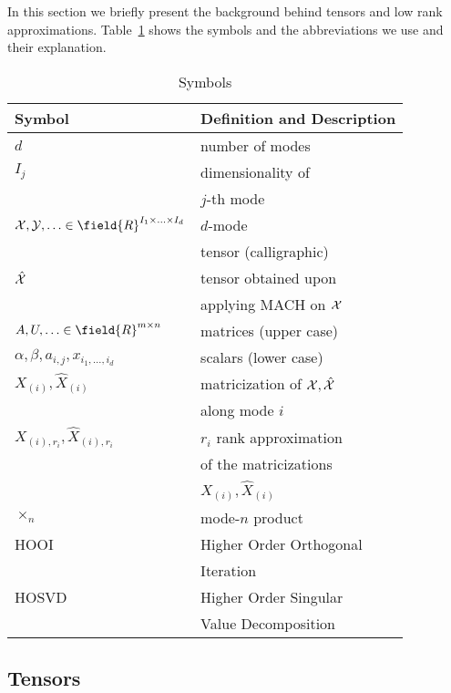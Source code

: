 In this section we briefly present the background behind tensors and low rank approximations. 
Table~\ref{tab:symbol} shows the symbols and the abbreviations we use and their explanation.

\begin{table}[htb]
\begin{center}
\begin{tabular}{|l|l|} \hline
Symbol & Definition and Description \\ \hline \hline
$d$ & number of modes \\ \hline
$I_j$ & dimensionality of \\ 
      &  $j$-th mode \\ \hline 
${\cal X,Y},\ldots \in \field{R}^{I_1 \times \ldots \times I_d}$ & $d$-mode  \\ 
         & tensor (calligraphic) \\ \hline
$ {\cal \hat{X}}$ & tensor obtained upon  \\ 
                    & applying MACH on ${\cal X}$      \\ \hline
$A,U,\ldots \in \field{R}^{m\times n}$ & matrices (upper case)  \\ \hline
$\alpha,\beta,a_{i,j},x_{i_1,\ldots,i_d}$ & scalars (lower case)  \\ \hline
$X_{(i)},\hat{X}_{(i)}$   & matricization of ${\cal X},{\cal \hat{X}}$ \\
            & along mode $i$ \\ \hline
$X_{(i),r_i}, \hat{X}_{(i),r_i}$ &  $r_i$ rank approximation  \\ 
            &  of the matricizations \\
			& $X_{(i)},\hat{X}_{(i)}$ \\ \hline
$\times_n$ & mode-$n$ product  \\  \hline
HOOI & Higher Order Orthogonal \\ 
     & Iteration \cite{354405}  \\  \hline
HOSVD & Higher Order Singular \\
      & Value Decomposition \cite{citeulike:4308452}  \\ \hline
\end{tabular}
\caption{Symbols}
\label{tab:symbol}
\end{center}
\end{table}

\subsection{Tensors}

